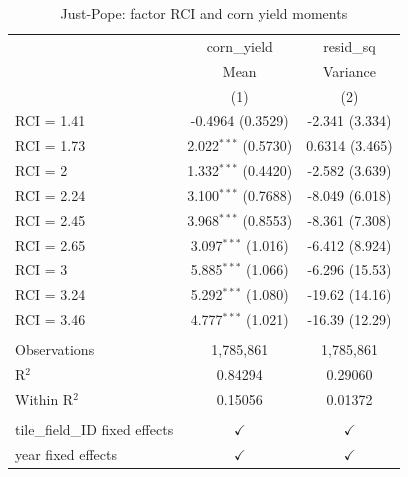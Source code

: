 
\begin{table}[H]
   \caption{\label{tab:corn_rci_jp} Just-Pope: factor RCI and corn yield moments}
   \bigskip
   \centering
   \begin{tabular}{lcc}
      \toprule
                                      & corn\_yield            & resid\_sq\\   
                                      & Mean                   & Variance \\   
                                      & (1)                    & (2)\\  
      \midrule 
      RCI = 1.41                      & -0.4964 (0.3529)       & -2.341 (3.334)\\   
      RCI = 1.73                      & 2.022$^{***}$ (0.5730) & 0.6314 (3.465)\\   
      RCI = 2                         & 1.332$^{***}$ (0.4420) & -2.582 (3.639)\\   
      RCI = 2.24                      & 3.100$^{***}$ (0.7688) & -8.049 (6.018)\\   
      RCI = 2.45                      & 3.968$^{***}$ (0.8553) & -8.361 (7.308)\\   
      RCI = 2.65                      & 3.097$^{***}$ (1.016)  & -6.412 (8.924)\\   
      RCI = 3                         & 5.885$^{***}$ (1.066)  & -6.296 (15.53)\\   
      RCI = 3.24                      & 5.292$^{***}$ (1.080)  & -19.62 (14.16)\\   
      RCI = 3.46                      & 4.777$^{***}$ (1.021)  & -16.39 (12.29)\\   
       \\
      Observations                    & 1,785,861              & 1,785,861\\  
      R$^2$                           & 0.84294                & 0.29060\\  
      Within R$^2$                    & 0.15056                & 0.01372\\  
       \\
      tile\_field\_ID fixed effects   & $\checkmark$           & $\checkmark$\\   
      year fixed effects              & $\checkmark$           & $\checkmark$\\   
      \bottomrule
   \end{tabular}
\end{table}


